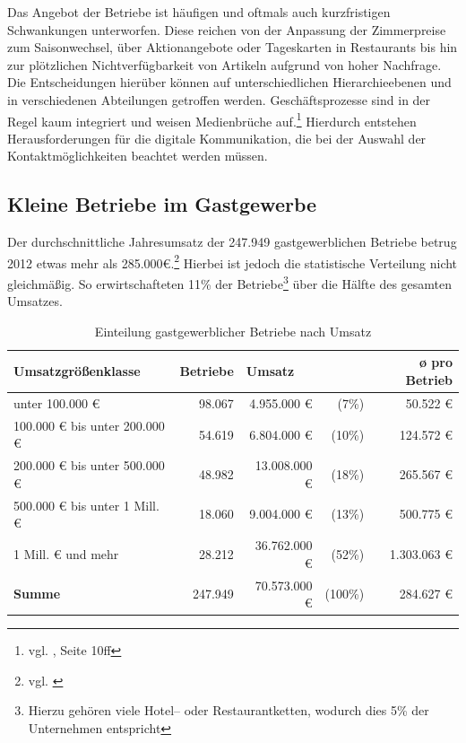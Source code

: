 Das Angebot der Betriebe ist häufigen und oftmals auch kurzfristigen Schwankungen unterworfen. Diese reichen von der Anpassung der Zimmerpreise zum Saisonwechsel, über Aktionangebote oder Tageskarten in Restaurants bis hin zur plötzlichen Nichtverfügbarkeit von Artikeln aufgrund von hoher Nachfrage. Die Entscheidungen hierüber können auf unterschiedlichen Hierarchieebenen und in verschiedenen Abteilungen getroffen werden. Geschäftsprozesse sind in der Regel kaum integriert und weisen Medienbrüche auf.\footnote{vgl. \cite{waidele:integration}, Seite 10ff} Hierdurch entstehen Herausforderungen für die digitale Kommunikation, die bei der Auswahl der Kontaktmöglichkeiten beachtet werden müssen.

\subsection{Kleine Betriebe im Gastgewerbe} %
\label{sub:kleine_betriebe_im_gastgewerbe}
Der durchschnittliche Jahresumsatz der 247.949 gastgewerblichen Betriebe betrug 2012 etwas mehr als 285.000€.\footnote{vgl. \cite{destatis:genesis}} Hierbei ist jedoch die statistische Verteilung nicht gleichmäßig. So erwirtschafteten 11\% der Betriebe\footnote{Hierzu gehören viele Hotel– oder Restaurantketten, wodurch dies 5\% der Unternehmen entspricht} über die Hälfte des gesamten Umsatzes.

\begin{table}[H]
\begin{center}
\begin{footnotesize}
\begin{tabular}{| l | r | r  r | r |}  \hline                       
  \textbf{Umsatzgrößenklasse}              & \textbf{Betriebe} & \multicolumn{2}{|l|}{\textbf{Umsatz}}  & \textbf{ø pro Betrieb} \\ \hline 
  unter 100.000 €               & 98.067   &  4.955.000 € &   (7\%) &    50.522 € \\  \hline  
  100.000 € bis unter 200.000 € & 54.619   &  6.804.000 € &  (10\%) &   124.572 € \\  \hline  
  200.000 € bis unter 500.000 € & 48.982   & 13.008.000 € &  (18\%) &   265.567 € \\  \hline  
  500.000 € bis unter 1 Mill. € & 18.060   &  9.004.000 € &  (13\%) &   500.775 € \\  \hline  
  1 Mill. € und mehr            & 28.212   & 36.762.000 € &  (52\%) & 1.303.063 € \\  \hline  
  \textbf{Summe}                & 247.949  & 70.573.000 € & (100\%) &   284.627 € \\  \hline  
\end{tabular}
\end{footnotesize}
\caption[Einteilung gastgewerblicher Betriebe nach Umsatz]{Einteilung gastgewerblicher Betriebe nach Umsatz\protect\footnotemark}
\label{tab:betriebsgroessen}
\end{center}
\end{table}

